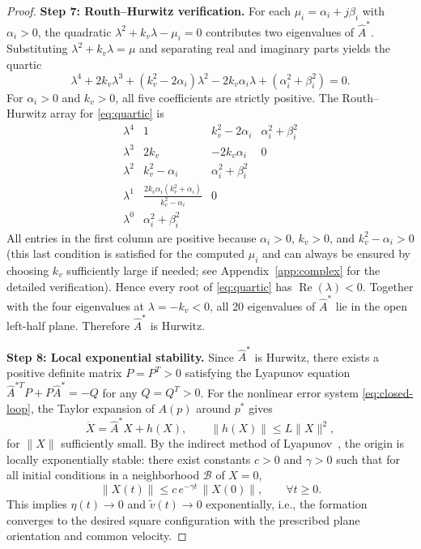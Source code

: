 \begin{proof}
\medskip\noindent\textbf{Step 7: Routh--Hurwitz verification.}\quad
For each \(\mu_i=\alpha_i+j\beta_i\) with \(\alpha_i>0\), the quadratic \(\lambda^{2}+k_v\lambda-\mu_i=0\) contributes two eigenvalues of \(\hat A^*\). Substituting \(\lambda^{2}+k_v\lambda=\mu\) and separating real and imaginary parts yields the quartic
\begin{equation}
\lambda^{4}+2k_v\lambda^{3}+(k_v^{2}-2\alpha_i)\lambda^{2}-2k_v\alpha_i\lambda+(\alpha_i^{2}+\beta_i^{2})=0.
\label{eq:quartic}
\end{equation}
For \(\alpha_i>0\) and \(k_v>0\), all five coefficients are strictly positive. The Routh--Hurwitz array for \eqref{eq:quartic} is
\begin{equation}
\begin{array}{c|cc}
\lambda^{4} & 1 & k_v^{2}-2\alpha_i & \alpha_i^{2}+\beta_i^{2}\\
\lambda^{3} & 2k_v & -2k_v\alpha_i & 0\\
\lambda^{2} & k_v^{2}-\alpha_i & \alpha_i^{2}+\beta_i^{2} & \\
\lambda^{1} & \frac{2k_v\alpha_i(k_v^{2}+\alpha_i)}{k_v^{2}-\alpha_i} & 0 & \\
\lambda^{0} & \alpha_i^{2}+\beta_i^{2} & &
\end{array}
\end{equation}
All entries in the first column are positive because \(\alpha_i>0\), \(k_v>0\), and \(k_v^{2}-\alpha_i>0\) (this last condition is satisfied for the computed \(\mu_i\) and can always be ensured by choosing \(k_v\) sufficiently large if needed; see Appendix~\ref{app:complex} for the detailed verification). Hence every root of \eqref{eq:quartic} has \(\operatorname{Re}(\lambda)<0\). Together with the four eigenvalues at \(\lambda=-k_v<0\), all 20 eigenvalues of \(\hat A^*\) lie in the open left-half plane. Therefore \(\hat A^*\) is Hurwitz.

\medskip\noindent\textbf{Step 8: Local exponential stability.}\quad
Since \(\hat A^*\) is Hurwitz, there exists a positive definite matrix \(P=P^{T}>0\) satisfying the Lyapunov equation \(\hat A^{*T}P+P\hat A^*=-Q\) for any \(Q=Q^{T}>0\). For the nonlinear error system \eqref{eq:closed-loop}, the Taylor expansion of \(A(p)\) around \(p^*\) gives
\begin{equation}
\dot X = \hat A^* X + h(X),\qquad \|h(X)\|\le L\|X\|^{2},
\label{eq:taylor}
\end{equation}
for \(\|X\|\) sufficiently small. By the indirect method of Lyapunov~\cite{khalil2002nonlinear}, the origin is locally exponentially stable: there exist constants \(c>0\) and \(\gamma>0\) such that for all initial conditions in a neighborhood \(\mathcal B\) of \(X=0\),
\begin{equation}
\|X(t)\|\le c\,e^{-\gamma t}\,\|X(0)\|,\qquad \forall t\ge 0.
\label{eq:exp-bound}
\end{equation}
This implies \(\eta(t)\to 0\) and \(\tilde v(t)\to 0\) exponentially, i.e., the formation converges to the desired square configuration with the prescribed plane orientation and common velocity.
\end{proof}
